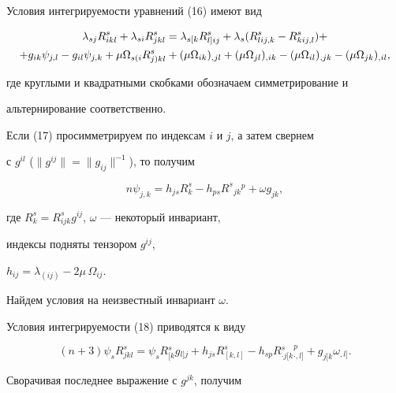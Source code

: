 Условия интегрируемости уравнений (16) имеют вид


\begin{gather}


\lambda_{sj}R^s_{ikl}+\lambda_{si}R^s_{jkl}=


\lambda{}_{s[k}R{}^s_{l]ij}+


\lambda_s(R^s_{lij,k}-R^s_{kij,l})+\notag \\


+g_{ik}\psi_{j,l}-g_{il}\psi_{j,k}+


\mu\Omega_{s(i} R^s_{j)kl}+


(\mu\Omega_{ik})_{,jl}+(\mu\Omega_{jl})_{,ik}-


(\mu\Omega_{il})_{,jk}-(\mu\Omega_{jk})_{,il},


\end{gather}


где круглыми и квадратными скобками обозначаем симметрирование и


альтернирование соответственно.





Если (17) просимметрируем по индексам $i$ и $j$, а затем свернем


с $g^{il}$ ($\|g^{ij}\|=\|g_{ij}\|^{-1}$), то получим


\begin{equation}


n\psi_{j,k}=h_{js}R^s_k-h_{ps}R^s{}_{jk}{}^p+\omega g_{jk},


\end{equation}


где $R^s_k=R^s_{ijk}g^{ij}$, $\omega$ --- некоторый инвариант,


индексы подняты тензором $g^{ij}$, 


$h_{ij}=\lambda_{(ij)}-2\mu\,\Omega_{ij}$. 





Найдем условия на неизвестный инвариант $\omega$.


Условия интегрируемости (18) приводятся к виду


$$


(n+3)\psi_sR_{jkl}^s=


\psi_sR{}_{[k}^sg{}_{l]j}+h_{js}R_{[k,l]}^s-h_{sp}R{}^s


_{\cdot j[k}{}^p_{\cdot,l]}+g_{j[k}\omega_{,l]}. 


$$


Сворачивая последнее выражение с $g^{jk}$, получим



